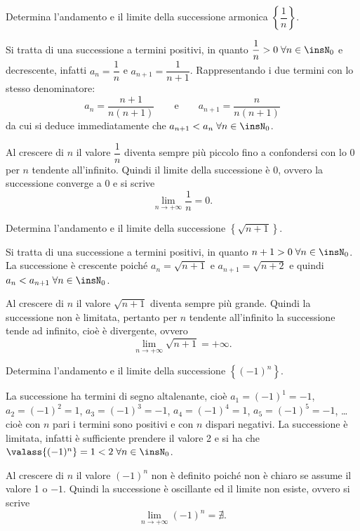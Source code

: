 \begin{exrig}
\begin{esempio}
Determina l'andamento e il limite della successione armonica $\left\{\dfrac{1}{n}\right\}$.

Si tratta di una successione a termini positivi, in quanto $\dfrac{1}{n}>0\;\forall n\in\insN_0$ e decrescente, infatti $a_n=\dfrac{1}{n}$ e $a_{n+1}=\dfrac{1}{n+1}$. Rappresentando i due termini con lo stesso denominatore:
\[a_n=\dfrac{n+1}{n(n+1)}\qquad\text{e}\qquad a_{n+1}=\dfrac{n}{n(n+1)}\]
da cui si deduce immediatamente che $a_{n+1}<a_n\;\forall n \in \insN_0$.

Al crescere di $n$ il valore $\dfrac{1}{n}$ diventa sempre più piccolo fino a confondersi con lo 0 per $n$ tendente all'infinito. Quindi il limite della successione è 0, ovvero la successione converge a 0 e si scrive
\[\lim_{n\to+\infty} \dfrac{1}{n} = 0.\]
\end{esempio}

\begin{esempio}
Determina l'andamento e il limite della successione $\left\{\sqrt{n+1}\right\}$.

Si tratta di una successione a termini positivi, in quanto $n+1>0\;\forall n\in\insN_0$. La successione è crescente poiché $a_n=\sqrt{n+1}$ e $a_{n+1}=\sqrt{n+2}$ e quindi $a_n < a_{n+1}\;\forall n\in\insN_0$. 

Al crescere di $n$ il valore $\sqrt{n+1}$ diventa sempre più grande. Quindi la successione non è limitata, pertanto per $n$ tendente all'infinito la successione tende ad infinito, cioè è divergente, ovvero
\[\lim_{n\to+\infty} \sqrt{n+1} = +\infty.\]

\end{esempio}

\begin{esempio}
Determina l'andamento e il limite della successione $\left\{(-1)^n\right\}$.

La successione ha termini di segno altalenante, cioè $a_1 = (-1)^1 = -1$, $a_2 = (-1)^2 = 1$, $a_3 = (-1)^3 = -1$, $a_4 = (-1)^4 = 1$, $a_5 = (-1)^5 = -1$, \ldots{} cioè con $n$ pari i termini sono positivi e con $n$ dispari negativi. La successione è limitata, infatti è sufficiente prendere il valore 2 e si ha che $\valass{(-1)^n}=1<2\;\forall n\in\insN_0$.

Al crescere di $n$ il valore $(-1)^n$ non è definito poiché non è chiaro se assume il valore 1 o $-1$. Quindi la successione è oscillante ed il limite non esiste, ovvero si scrive
\[\lim_{n\to+\infty} (-1)^n = \nexists.\]
\end{esempio}


\end{exrig}
